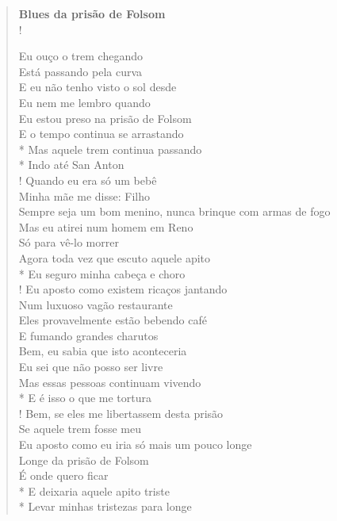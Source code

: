 \documentclass[11pt]{extarticle}
\begin{document}
\begin{enumerate}

\begin{verse}
\textbf{Blues da prisão de Folsom}\\!

Eu ouço o trem chegando\\
Está passando pela curva\\
E eu não tenho visto o sol desde\\
Eu nem me lembro quando\\
Eu estou preso na prisão de Folsom\\
E o tempo continua se arrastando\\*
Mas aquele trem continua passando\\*
Indo até San Anton\\!
Quando eu era só um bebê\\
Minha mãe me disse: Filho\\
Sempre seja um bom menino, nunca brinque com armas de fogo\\
Mas eu atirei num homem em Reno\\
Só para vê-lo morrer\\
Agora toda vez que escuto aquele apito\\*
Eu seguro minha cabeça e choro\\!
Eu aposto como existem ricaços jantando\\
Num luxuoso vagão restaurante\\
Eles provavelmente estão bebendo café\\
E fumando grandes charutos\\
Bem, eu sabia que isto aconteceria\\
Eu sei que não posso ser livre\\
Mas essas pessoas continuam vivendo\\*
E é isso o que me tortura\\!
Bem, se eles me libertassem desta prisão\\
Se aquele trem fosse meu\\
Eu aposto como eu iria só mais um pouco longe\\
Longe da prisão de Folsom\\
É onde quero ficar\\*
E deixaria aquele apito triste\\*
Levar minhas tristezas para longe
\end{verse}


\end{enumerate}
\end{document}

